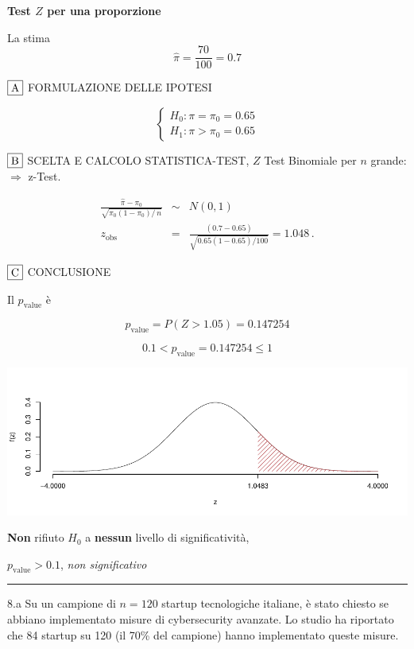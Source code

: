 \documentclass[
  11pt,
]{book}
\theoremstyle{mytheoremstyle}
\theoremstyle{mydefstyle}
\newenvironment{sol}
  {
  \begin{tcolorbox}[enhanced,breakable,arc=0.1mm,boxrule=1pt,colback=white,colframe=iblue,
  title=\bf \fontfamily{lmss}\selectfont \hspace{.5 cm} Soluzione,drop fuzzy shadow]

}{
\end{tcolorbox}
  }
\begin{document}
\begin{sol}
\textbf{Test \(Z\) per una proporzione}

La stima
\[\hat\pi=\frac { 70 } { 100 }= 0.7  \]

\(\fbox{A}\) FORMULAZIONE DELLE IPOTESI

\[\begin{cases}
   H_0: \pi = \pi_0=0.65 \\
   H_1: \pi > \pi_0=0.65 
   \end{cases}\]

\(\fbox{B}\) SCELTA E CALCOLO STATISTICA-TEST, \(Z\)
Test Binomiale per \(n\) grande: \(\Rightarrow\) z-Test.

\begin{eqnarray*}
   \frac{\hat\pi - \pi_{0}} {\sqrt {\pi_0(1-\pi_0)/\,n}}&\sim&N(0,1)\\
   z_{\text{obs}}
   &=& \frac{ ( 0.7 -  0.65 )} {\sqrt{ 0.65 (1- 0.65 )/ 100 }}
   =   1.048 \,.
   \end{eqnarray*}

\(\fbox{C}\) CONCLUSIONE

Il \(p_{\text{value}}\) è

\[ p_{\text{value}} = P(Z>1.05)=0.147254 \]

\[
 0.1 < p_\text{value}= 0.147254 \leq 1 
\]

\begin{center}\includegraphics{Esami_passati_con_soluzioni_files/figure-latex/05-test-21-1} \end{center}

\textbf{Non} rifiuto \(H_0\) a \textbf{nessun}
livello di significatività,

\(p_\text{value}>0.1\),
\emph{non significativo}

\end{sol}

\begin{center}\rule{0.5\linewidth}{0.5pt}\end{center}

8.a Su un campione di \(n = 120\) startup tecnologiche italiane, è stato chiesto se abbiano implementato misure di cybersecurity avanzate. Lo studio ha riportato che 84 startup su 120 (il 70\% del campione) hanno implementato queste misure.
\end{document}

